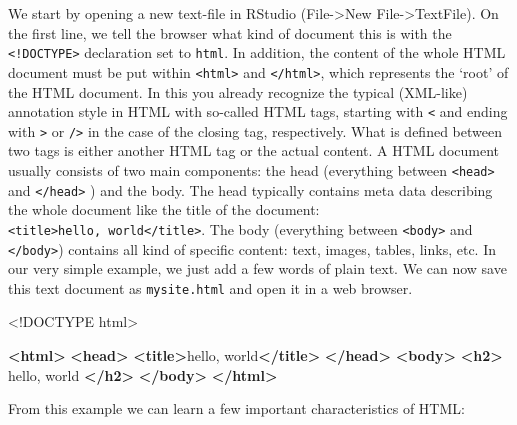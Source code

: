 \documentclass[
  12pt,
]{style/krantz}
\newenvironment{Shaded}{\begin{snugshade}}{\end{snugshade}}
\newcommand{\DataTypeTok}[1]{\textcolor[rgb]{0.13,0.29,0.53}{#1}}
\newcommand{\KeywordTok}[1]{\textcolor[rgb]{0.13,0.29,0.53}{\textbf{#1}}}
\newcommand{\NormalTok}[1]{#1}
\begin{document}
We start by opening a new text-file in RStudio (File-\textgreater New File-\textgreater TextFile). On the first line, we tell the browser what kind of document this is with the \texttt{\textless{}!DOCTYPE\textgreater{}} declaration set to \texttt{html}. In addition, the content of the whole HTML document must be put within \texttt{\textless{}html\textgreater{}} and \texttt{\textless{}/html\textgreater{}}, which represents the `root' of the HTML document. In this you already recognize the typical (XML-like) annotation style in HTML with so-called HTML tags, starting with \texttt{\textless{}} and ending with \texttt{\textgreater{}} or \texttt{/\textgreater{}} in the case of the closing tag, respectively. What is defined between two tags is either another HTML tag or the actual content. A HTML document usually consists of two main components: the head (everything between \texttt{\textless{}head\textgreater{}} and \texttt{\textless{}/head\textgreater{}} ) and the body. The head typically contains meta data describing the whole document like the title of the document: \texttt{\textless{}title\textgreater{}hello,\ world\textless{}/title\textgreater{}}. The body (everything between \texttt{\textless{}body\textgreater{}} and \texttt{\textless{}/body\textgreater{}}) contains all kind of specific content: text, images, tables, links, etc. In our very simple example, we just add a few words of plain text. We can now save this text document as \texttt{mysite.html} and open it in a web browser.

\begin{Shaded}
\begin{Highlighting}[]
     \DataTypeTok{\textless{}!DOCTYPE }\NormalTok{html}\DataTypeTok{\textgreater{}}

     \KeywordTok{\textless{}html\textgreater{}}
         \KeywordTok{\textless{}head\textgreater{}}
             \KeywordTok{\textless{}title\textgreater{}}\NormalTok{hello, world}\KeywordTok{\textless{}/title\textgreater{}}
         \KeywordTok{\textless{}/head\textgreater{}}
         \KeywordTok{\textless{}body\textgreater{}}
             \KeywordTok{\textless{}h2\textgreater{}}\NormalTok{ hello, world }\KeywordTok{\textless{}/h2\textgreater{}}
         \KeywordTok{\textless{}/body\textgreater{}}
     \KeywordTok{\textless{}/html\textgreater{}}
\end{Highlighting}
\end{Shaded}

From this example we can learn a few important characteristics of HTML:
\end{document}
